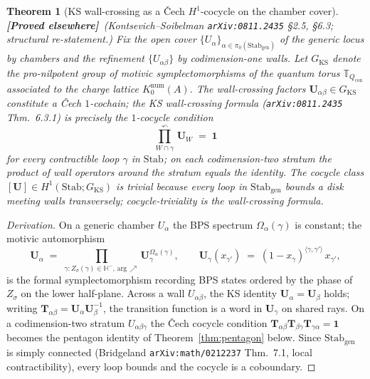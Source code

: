 \documentclass[11pt]{amsart}
\newtheorem{theorem}{Theorem}[section]
\theoremstyle{definition}
\providecommand{\bT}{\mathbb{T}}
\providecommand{\bH}{\mathbb{H}}
\providecommand{\ClaimStatusProvedElsewhere}{\textbf{\textsf{[Proved elsewhere]}}}
\begin{document}
\begin{theorem}[KS wall-crossing as a \v{C}ech $H^1$-cocycle on the chamber cover]
\label{thm:ks-h1-cocycle}
\ClaimStatusProvedElsewhere\ \emph{(Kontsevich--Soibelman
\texttt{arXiv:0811.2435} §2.5, §6.3; structural re-statement.)}
Fix the open cover $\{U_\alpha\}_{\alpha \in
\pi_0(\mathrm{Stab}_{\mathrm{gen}})}$ of the generic locus by
chambers and the refinement $\{U_{\alpha\beta}\}$ by codimension-one
walls. Let $G_{\mathrm{KS}}$ denote the pro-nilpotent group of
motivic symplectomorphisms of the quantum torus
$\bT_{Q_{\mathrm{con}}}$ associated to the charge lattice
$K_0^{\mathrm{num}}(A)$. The wall-crossing factors
$\mathbf{U}_{\alpha\beta} \in G_{\mathrm{KS}}$ constitute a \v{C}ech
$1$-cochain; the KS wall-crossing formula (\texttt{arXiv:0811.2435}
Thm.~6.3.1) is precisely the $1$-cocycle condition
\[
  \prod^\curvearrowleft_{W \cap \gamma}\, \mathbf{U}_W \;=\; \mathbf{1}
\]
for every contractible loop $\gamma$ in $\mathrm{Stab}$; on each
codimension-two stratum the product of wall operators around the
stratum equals the identity. The cocycle class $[\mathbf{U}] \in
H^1(\mathrm{Stab}; G_{\mathrm{KS}})$ is trivial because every loop in
$\mathrm{Stab}_{\mathrm{gen}}$ bounds a disk meeting walls
transversely; cocycle-triviality is the wall-crossing formula.
\end{theorem}

\begin{proof}[Derivation]
On a generic chamber $U_\alpha$ the BPS spectrum
$\Omega_\alpha(\gamma)$ is constant; the motivic automorphism
\[
  \mathbf{U}_\alpha
  \;=\; \prod_{\gamma : Z_\sigma(\gamma) \in \bH^-,\,
    \mathrm{arg}\,\nearrow}
      \mathbf{U}_\gamma^{\Omega_\alpha(\gamma)},
  \qquad
  \mathbf{U}_\gamma(x_{\gamma'})
  \;=\; (1 - x_\gamma)^{\langle \gamma, \gamma'\rangle}\, x_{\gamma'},
\]
is the formal symplectomorphism recording BPS states ordered by the
phase of $Z_\sigma$ on the lower half-plane. Across a wall
$U_{\alpha\beta}$, the KS identity $\mathbf{U}_\alpha =
\mathbf{U}_\beta$ holds; writing $\mathbf{T}_{\alpha\beta} =
\mathbf{U}_\alpha \mathbf{U}_\beta^{-1}$, the transition function is
a word in $\mathbf{U}_\gamma$ on shared rays. On a codimension-two
stratum $U_{\alpha\beta\gamma}$ the \v{C}ech cocycle condition
$\mathbf{T}_{\alpha\beta} \mathbf{T}_{\beta\gamma}
\mathbf{T}_{\gamma\alpha} = \mathbf{1}$ becomes the pentagon identity
of Theorem~\ref{thm:pentagon} below. Since
$\mathrm{Stab}_{\mathrm{gen}}$ is simply connected (Bridgeland
\texttt{arXiv:math/0212237} Thm.~7.1, local contractibility), every
loop bounds and the cocycle is a coboundary.
\end{proof}
\end{document}
